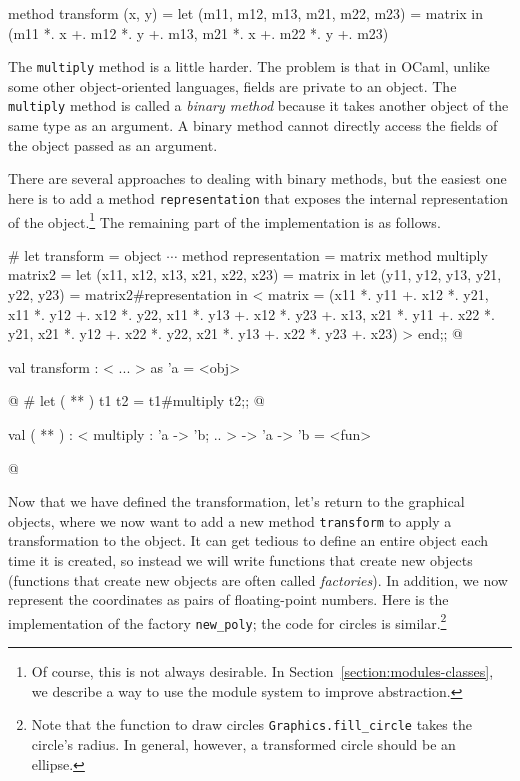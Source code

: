 \label{page:transform-methods}
\begin{ocaml}
   method transform (x, y) =
      let (m11, m12, m13, m21, m22, m23) = matrix in
      (m11 *. x +. m12 *. y +. m13,
       m21 *. x +. m22 *. y +. m23)
\end{ocaml}
%
The \hbox{\lstinline/multiply/} method is a little harder.  The problem is that in OCaml, unlike some other
object-oriented languages, fields are private to an object.  The \hbox{\lstinline/multiply/} method is
called a \emph{binary method} because it takes another object of the same type as an argument.  A
binary method cannot directly access the fields of the object passed as an argument.

\label{objects:binary-methods}
There are several approaches to dealing with binary methods, but the easiest one here is to add a
method \hbox{\lstinline/representation/} that exposes the internal representation of the object.\footnote{Of
course, this is not always desirable.  In Section~\ref{section:modules-classes}, we describe a way
to use the module system to improve abstraction.}  The remaining part of the implementation is as
follows.

\begin{ocaml}
# let transform =
object
   $\cdots$
   method representation = matrix
   method multiply matrix2 =
      let (x11, x12, x13, x21, x22, x23) = matrix in
      let (y11, y12, y13, y21, y22, y23) = matrix2#representation in
      {< matrix =
            (x11 *. y11 +. x12 *. y21,
             x11 *. y12 +. x12 *. y22,
             x11 *. y13 +. x12 *. y23 +. x13,
             x21 *. y11 +. x22 *. y21,
             x21 *. y12 +. x22 *. y22,
             x21 *. y13 +. x22 *. y23 +. x23)
      >}
end;;
@
\begin{topoutput}
val transform : < ... > as 'a = <obj>
\end{topoutput}
@
# let ( ** ) t1 t2 = t1#multiply t2;;
@
\begin{topoutput}
val ( ** ) : < multiply : 'a -> 'b; .. > -> 'a -> 'b = <fun>
\end{topoutput}
@
\end{ocaml}
%

Now that we have defined the transformation, let's return to the graphical objects, where we now
want to add a new method \hbox{\lstinline/transform/} to apply a transformation to the object.  It can get
tedious to define an entire object each time it is created, so instead we will write functions that
create new objects (functions that create new objects are often called \emph{factories}).  In
addition, we now represent the coordinates as pairs of floating-point numbers.  Here is the
implementation of the factory \hbox{\lstinline/new_poly/}; the code for circles is similar.\footnote{Note
that the function to draw circles \hbox{\lstinline/Graphics.fill_circle/} takes the circle's radius.  In
general, however, a transformed circle should be an ellipse.}

